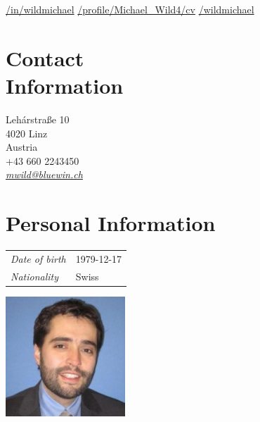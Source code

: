 \documentclass[line,11pt,a4paper]{../resume}
\newcommand{\mail}[1]{\textsl{\href{mailto:#1}{#1}}}
\begin{document}
\begin{resume}
\vspace{-4mm}
\-\hspace{-12.3mm}\begin{minipage}{15cm}
\href{https://linkedin.com/in/wildmichael}{\faLinkedinSquare/in/wildmichael}\quad
\href{https://xing.com/profile/Michael_Wild4/cv}{\faXingSquare/profile/Michael\_Wild4/cv}\quad
\href{https://github.com/wildmichael}{\faGithubSquare/wildmichael}
\end{minipage}

\begin{multicols}{2}

\section{\mysidestyle Contact\\Information}\vspace{2mm}

Leh\'{a}rstra{\ss}e 10 \\
4020 Linz \\
Austria \\
+43 660 2243450 \\
\mail{mwild@bluewin.ch}

\section{\mysidestyle Personal Information}\vspace{2mm}

\begin{tabular}{@{}ll}
\textsl{Date of birth} & 1979-12-17 \\
\textsl{Nationality}   & Swiss
\end{tabular}

\columnbreak
\vspace*{-9mm}\hfill\includegraphics[width=45mm]{../mwild}

\end{multicols}


\end{resume}
\end{document}

